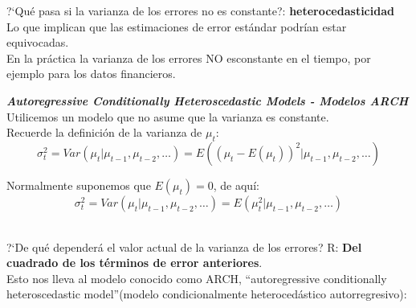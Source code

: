 	?`Qu\'e pasa si la varianza de los errores no es constante?: \textbf{heterocedasticidad}\\
	\vspace{4mm}	
	Lo que implican que las estimaciones de error est\'andar podr\'{i}an estar equivocadas.\\
	En la pr\'actica  la varianza de los errores NO esconstante en el tiempo, por ejemplo para los datos financieros.
	

	\pagebreak\textit{\textbf{Autoregressive Conditionally Heteroscedastic Models - Modelos ARCH}}\\
	Utilicemos un modelo que no asume que la varianza es constante.\\
	
	Recuerde la definici\'on de la varianza de $\mu_t$:\\
	
	\begin{equation}
	\sigma_t^2 = Var(\mu_t | \mu_{t-1},  \mu_{t-2}, \dots{}) = E((\mu_t -E(\mu_{t}))^2 | \mu_{t-1},  \mu_{t-2}, \dots{})
	\end{equation}
	\vspace{4mm}	
	
	
	Normalmente suponemos que $E(\mu_t) = 0$, de aqu\'{i}:
	\begin{equation}
	\sigma_t^2 = Var(\mu_t | \mu_{t-1},  \mu_{t-2}, \dots{}) = E(\mu_{t}^2 | \mu_{t-1},  \mu_{t-2}, \dots{})
	\end{equation} 
	
	?`De qu\'e depender\'a el valor actual de la varianza de los errores? R: \textbf{Del cuadrado de los t\'erminos de error anteriores}.\\
	

	
	Esto nos lleva al modelo conocido como ARCH, \textquotedblleft autoregressive conditionally heteroscedastic model\textquotedblright (modelo condicionalmente heterocedástico autorregresivo):
	
